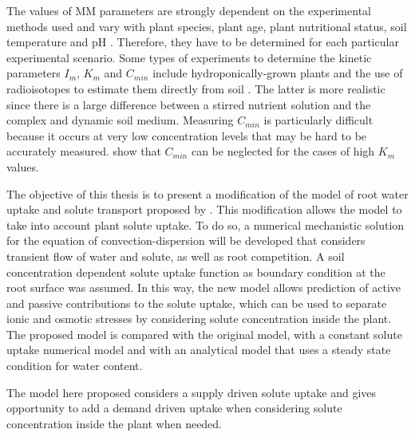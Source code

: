 The values of MM parameters are strongly dependent on the experimental methods used and vary with plant species, plant age, plant nutritional status, soil temperature and pH \citep{barber,shi}. 
Therefore, they have to be determined for each particular experimental scenario.
Some types of experiments to determine the kinetic parameters $I_m$, $K_m$ and $C_{min}$ include hydroponically-grown plants \citep{barber} and the use of radioisotopes to estimate them directly from soil \citep{nye77}. 
The latter is more realistic since there is a large difference between a stirred nutrient solution and the complex and dynamic soil medium.
Measuring $C_{min}$ is particularly difficult \citep{lambers,seeling} because it occurs at very low concentration levels that may be hard to be accurately measured. 
\cite{seeling} show that $C_{min}$ can be neglected for the cases of high $K_m$ values.

The objective of this thesis is to present a modification of the model of root water uptake and solute transport proposed by \cite{liersolute}.
This modification allows the model to take into account plant solute uptake.
To do so, a numerical mechanistic solution for the equation of convection-dispersion will be developed that considers transient flow of water and solute, as well as root competition.
A soil concentration dependent solute uptake function as boundary condition at the root surface was assumed.
In this way, the new model allows prediction of active and passive contributions to the solute uptake, which can be used to separate ionic and osmotic stresses by considering solute concentration inside the plant. 
The proposed model is compared with the original model, with a constant solute uptake numerical model and with an analytical model that uses a steady state condition for water content. 

The model here proposed considers a supply driven solute uptake and gives opportunity to add a demand driven uptake when considering solute concentration inside the plant when needed.
